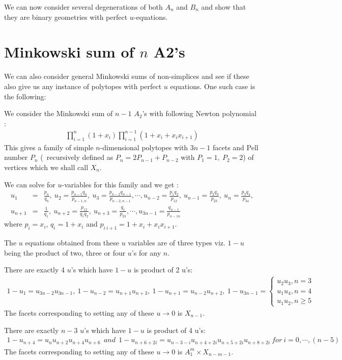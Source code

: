 \documentclass[hidelinks,12pt]{article}
\newcommand{\bea}[1]{\begin{eqnarray}\label{#1} }
\newcommand{\eea}{\end{eqnarray}}
\def\bea{\begin{eqnarray}}
\def\eea{\end{eqnarray}}
\begin{document}
We can now consider several degenerations of both $A_n$ and $B_n$ and show that they are binary geometries with perfect $u$-equations.
\newpage
\section*{Minkowski sum of $n$ A2's }
We can also consider general Minkowski sums of non-simplices and see if these also give us any instance of polytopes with perfect $u$ equations. One such case is the following:

We consider the Minkowski sum of $n-1$ $A_2$'s with following Newton polynomial :
\bea \label {new}
\prod_{i=1}^{n} (1+x_i ) \prod_{i=1}^{n-1} (1+x_i +x_i x_{i+1}) 
\eea 
This gives a family of simple $n$-dimensional polytopes with $3n-1$ facets  and Pell number $P_n$ (~recursively defined as $ P_n=2 P_{n-1} +P_{n-2}$ with $P_1=1,~ P_2=2$) of vertices which we shall call $X_n$. 

We can solve for $u$-variables for this family and we get :
\bea
u_1 &=& \frac{p_n}{q_n}, ~u_2 = \frac{p_{n-1}q_n}{p_{n-1,n}},~u_3 = \frac{p_{n-2}q_{n-1}}{p_{n-2,n-1}}, \cdots,
u_{n-2} = \frac{p_1 q_2}{p_{12}}, ~u_{n-1} = \frac{p_{2}q_3}{p_{23}},~u_n = \frac{p_{3}q_{4}}{p_{34}}, \nonumber \\
u_{n+1} &=& \frac{1}{q_1}, ~u_{n+2} = \frac{p_{12}}{q_{1}q_{2}},~u_{n+3} = \frac{q_{1}}{p_{23}}, \cdots,
u_{3n-1} = \frac{ q_{n-1}}{p_{n-1n}} \nonumber
\eea
where $p_i =x_i$, $q_i= 1+x_i$ and $p_{i~i+1}=1+x_i+ x_i x_{i+1}$.

The $u$ equations obtained from these $u$ variables are of three types viz. $1-u$ being the product of two, three or four $u$'s  for any $n$.  

There are exactly 4 $u$'s which have $1-u$ is product of 2 u's:
\bea
1-u_{1} =u_{3n-2} u_{3n-1},~
1-u_{n-2} =u_{n+1} u_{n+3},~
1-u_{n+1} =u_{n-2} u_{n+2},~
1-u_{3n-1} = \begin{cases}
u_{2} u_{3} , n=3\\
u_{1} u_{4} , n=4\\
u_{1} u_{2} , n\geq 5
\end{cases} \nonumber 
\eea
The facets corresponding to setting any of these $u \to 0$ is $X_{n-1}$.

There are exactly $n-3$ $u$'s which have $1-u$ is product of 4 u's:
\bea
1-u_{n+4} =u_{n} u_{n+2}u_{n+4} u_{n+6} ~~and~~
1-u_{n+6+ 2 i} =u_{n-3-i} u_{n+4+2 i} u_{n+5+2 i} u_{n+8+2 i}~ for~i=0,\cdots,(n-5) \nonumber 
\eea
The facets corresponding to setting any of these $u \to 0$ is $A^{m}_1 \times X_{n-m-1}$.
\end{document}

